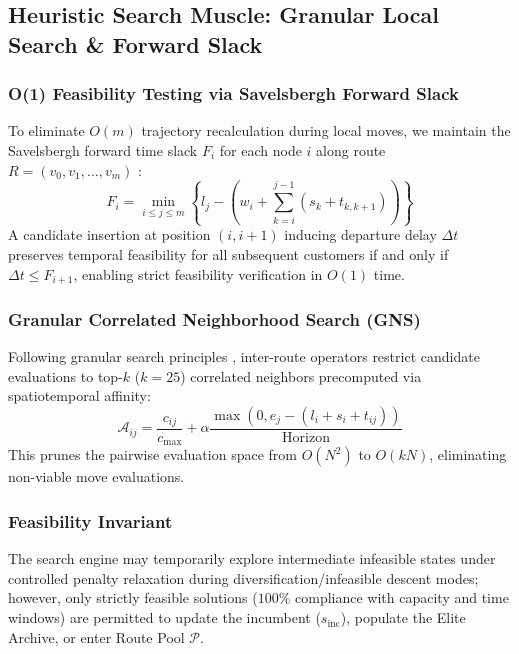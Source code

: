 \subsection{Heuristic Search Muscle: Granular Local Search \& Forward Slack}
\label{sec:search_muscle}

\subsubsection{O(1) Feasibility Testing via Savelsbergh Forward Slack}
To eliminate $O(m)$ trajectory recalculation during local moves, we maintain the Savelsbergh forward time slack $F_i$ for each node $i$ along route $R = (v_0, v_1, \dots, v_m)$ \cite{savelsbergh1992general}:
\begin{equation}
  F_i = \min_{i \le j \le m} \left\{ l_j - \left( w_i + \sum_{k=i}^{j-1} (s_k + t_{k, k+1}) \right) \right\}
  \label{eq:forward_slack}
\end{equation}
A candidate insertion at position $(i, i+1)$ inducing departure delay $\Delta t$ preserves temporal feasibility for all subsequent customers if and only if $\Delta t \le F_{i+1}$, enabling strict feasibility verification in $O(1)$ time.

\subsubsection{Granular Correlated Neighborhood Search (GNS)}
Following granular search principles \cite{toth2003granular}, inter-route operators restrict candidate evaluations to top-$k$ ($k=25$) correlated neighbors precomputed via spatiotemporal affinity:
\begin{equation}
  \mathcal{A}_{ij} = \frac{c_{ij}}{c_{\max}} + \alpha \frac{\max(0, e_j - (l_i + s_i + t_{ij}))}{\text{Horizon}}
  \label{eq:granular_affinity}
\end{equation}
This prunes the pairwise evaluation space from $O(N^2)$ to $O(k N)$, eliminating non-viable move evaluations.

\subsubsection{Feasibility Invariant}
The search engine may temporarily explore intermediate infeasible states under controlled penalty relaxation during diversification/infeasible descent modes; however, only strictly feasible solutions ($100\%$ compliance with capacity and time windows) are permitted to update the incumbent ($s_{\text{inc}}$), populate the Elite Archive, or enter Route Pool $\mathcal{P}$.


